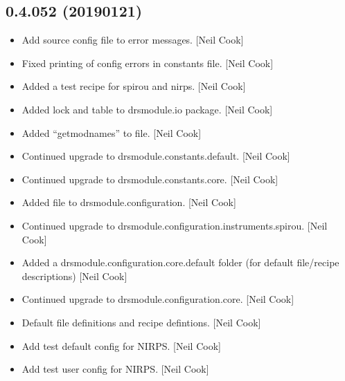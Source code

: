 \documentclass[a4paper,10pt,english]{report}
\begin{document}
\subsection{0.4.052 (2019\sphinxhyphen{}01\sphinxhyphen{}21)}
\label{\detokenize{misc/changelog:id231}}\begin{itemize}
\item {} 
Add source config file to error messages. {[}Neil Cook{]}

\item {} 
Fixed printing of config errors in constants file. {[}Neil Cook{]}

\item {} 
Added a test recipe for spirou and nirps. {[}Neil Cook{]}

\item {} 
Added lock and table to drsmodule.io package. {[}Neil Cook{]}

\item {} 
Added “getmodnames” to  file. {[}Neil Cook{]}

\item {} 
Continued upgrade to drsmodule.constants.default. {[}Neil Cook{]}

\item {} 
Continued upgrade to drsmodule.constants.core. {[}Neil Cook{]}

\item {} 
Added  file to drsmodule.configuration. {[}Neil Cook{]}

\item {} 
Continued upgrade to drsmodule.configuration.instruments.spirou. {[}Neil
Cook{]}

\item {} 
Added a drsmodule.configuration.core.default folder (for default
file/recipe descriptions) {[}Neil Cook{]}

\item {} 
Continued upgrade to drsmodule.configuration.core. {[}Neil Cook{]}

\item {} 
Default file definitions and recipe defintions. {[}Neil Cook{]}

\item {} 
Add test default config for NIRPS. {[}Neil Cook{]}

\item {} 
Add test user config for NIRPS. {[}Neil Cook{]}

\end{itemize}
\end{document}
